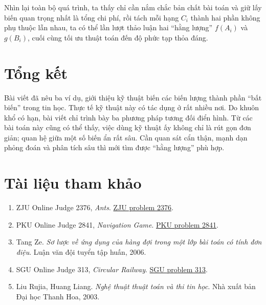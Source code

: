 \documentclass[11pt]{article}
\begin{document}
Nhìn lại toàn bộ quá trình, ta thấy chỉ cần nắm chắc bản chất bài toán và giữ
lấy biến quan trọng nhất là tổng chi phí, rồi tách mỗi hạng $C_i$ thành hai
phần không phụ thuộc lẫn nhau, ta có thể lần lượt thảo luận hai ``hằng lượng''
$f(A_i)$ và $g(B_i)$, cuối cùng tối ưu thuật toán đến độ phức tạp thỏa đáng.

\section{Tổng kết}

Bài viết đã nêu ba ví dụ, giới thiệu kỹ thuật biến các biến lượng thành phần
``bất biến'' trong tin học. Thực tế kỹ thuật này có tác dụng ở rất nhiều nơi.
Do khuôn khổ có hạn, bài viết chỉ trình bày ba phương pháp tương đối điển
hình. Từ các bài toán này cũng có thể thấy, việc dùng kỹ thuật ấy không chỉ là
rút gọn đơn giản; quan hệ giữa một số biến ẩn rất sâu. Cần quan sát cẩn thận,
mạnh dạn phỏng đoán và phân tích sâu thì mới tìm được ``hằng lượng'' phù hợp.

\section*{Tài liệu tham khảo}

\begin{enumerate}
  \item ZJU Online Judge 2376, \emph{Ants}.
  \href{http://acm.zju.edu.cn/show_problem.php?pid=2376}{ZJU problem 2376}.
  \item PKU Online Judge 2841, \emph{Navigation Game}.
  \href{http://acm.pku.edu.cn/JudgeOnline/problem?id=2841}{PKU problem 2841}.
  \item Tang Ze. \emph{Sơ lược về ứng dụng của hàng đợi trong một lớp bài toán
  có tính đơn điệu}. Luận văn đội tuyển tập huấn, 2006.
  \item SGU Online Judge 313, \emph{Circular Railway}.
  \href{http://acm.sgu.ru/problem.php?contest=0&problem=313}{SGU problem 313}.
  \item Liu Rujia, Huang Liang. \emph{Nghệ thuật thuật toán và thi tin học}.
  Nhà xuất bản Đại học Thanh Hoa, 2003.
\end{enumerate}
\end{document}
